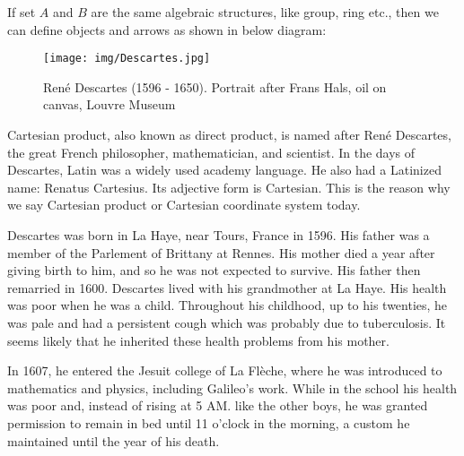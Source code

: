 \documentclass{article}
\begin{document}
If set $A$ and $B$ are the same algebraic structures, like group, ring etc., then we can define objects and arrows as shown in below diagram:

\begin{center}
\end{center}

\begin{figure}[htbp]
 \centering
 \texttt{[image: img/Descartes.jpg]}
 \captionsetup{labelformat=empty}
 \caption{René Descartes (1596 - 1650). Portrait after Frans Hals, oil on canvas, Louvre Museum}
 \label{fig:Decartes}
\end{figure}

 
Cartesian product, also known as direct product, is named after René Descartes, the great French philosopher, mathematician, and scientist. In the days of Descartes, Latin was a widely used academy language. He also had a Latinized name: Renatus Cartesius. Its adjective form is Cartesian. This is the reason why we say Cartesian product or Cartesian coordinate system today.

Descartes was born in La Haye, near Tours, France in 1596. His father was a member of the Parlement of Brittany at Rennes. His mother died a year after giving birth to him, and so he was not expected to survive. His father then remarried in 1600. Descartes lived with his grandmother at La Haye. His health was poor when he was a child. Throughout his childhood, up to his twenties, he was pale and had a persistent cough which was probably due to tuberculosis. It seems likely that he inherited these health problems from his mother.

In 1607, he entered the Jesuit college of La Flèche, where he was introduced to mathematics and physics, including Galileo's work. While in the school his health was poor and, instead of rising at 5 AM. like the other boys, he was granted permission to remain in bed until 11 o'clock in the morning, a custom he maintained until the year of his death.
\end{document}
